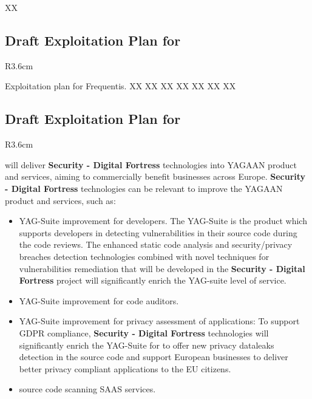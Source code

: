 \documentclass[a4paper,11pt]{article}
\newcommand{\project}[1]{\textbf{#1}\xspace}
\newcommand{\SECURITY}{\project{Security - Digital Fortress}}
\newcommand{\TheProject}{\SECURITY}
\begin{document}
XX
\horizontalline

\subsection*{Draft Exploitation Plan for \FRQshort{}}
\vspace{-6pt}

\begin{wrapfigure}{R}{3.6cm}
\vspace{-1.3cm}
\hfill {}
\vspace{-0.8cm}
\end{wrapfigure}

Exploitation plan for Frequentis.
XX
XX
XX
XX
XX
XX
XX

\horizontalline

\subsection*{Draft Exploitation Plan for \YAGshort{}}
\vspace{-6pt}

\begin{wrapfigure}{R}{3.6cm}
\vspace{-1.3cm}
\hfill {}
\vspace{-0.8cm}
\end{wrapfigure}

 \YAGshort{} will deliver \TheProject technologies into YAGAAN product and services, aiming to commercially benefit businesses across Europe. \TheProject technologies can be relevant to improve the YAGAAN product and services, such as:
\begin{itemize}
    \item YAG-Suite improvement for developers. The YAG-Suite is the \YAGshort{} product which supports developers in detecting vulnerabilities in their source code during the code reviews. The enhanced static code analysis and security/privacy breaches detection technologies combined with novel techniques for vulnerabilities remediation that will be developed in the \TheProject project will significantly enrich the YAG-suite level of service.
    \item YAG-Suite improvement for code auditors.
    \item YAG-Suite improvement for privacy assessment of applications: To support GDPR compliance, \TheProject technologies will significantly enrich the YAG-Suite for \YAGshort{} to offer new privacy dataleaks detection in the source code and support European businesses to deliver better privacy compliant applications to the EU citizens.
    \item \YAGshort{} source code scanning SAAS services.
\end{itemize}
\end{document}
